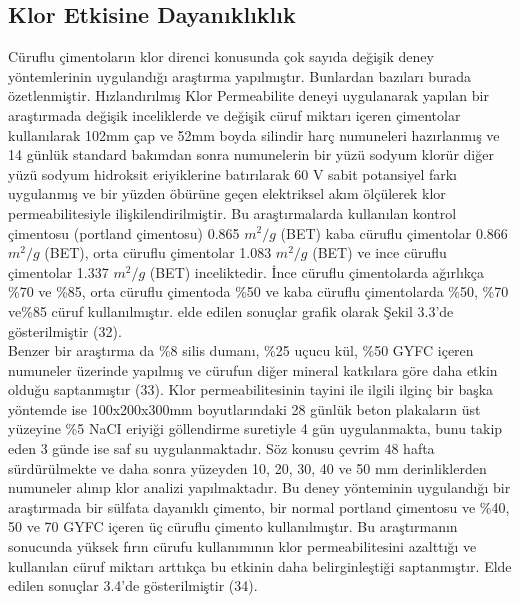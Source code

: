 \documentclass[12pt]{article}
\begin{document}
\subsection{Klor Etkisine Dayanıklıklık}
Cüruflu çimentoların klor direnci konusunda çok sayıda değişik deney
yöntemlerinin uygulandığı araştırma yapılmıştır. Bunlardan bazıları burada
özetlenmiştir.
Hızlandırılmış Klor Permeabilite deneyi uygulanarak yapılan bir araştırmada
değişik inceliklerde ve değişik cüruf miktarı içeren çimentolar kullanılarak
102mm çap ve 52mm boyda silindir harç numuneleri hazırlanmış ve
14 günlük standard bakımdan sonra numunelerin bir yüzü sodyum klorür
diğer yüzü sodyum hidroksit eriyiklerine batırılarak 60 V sabit potansiyel
farkı uygulanmış ve bir yüzden öbürüne geçen elektriksel akım ölçülerek
klor permeabilitesiyle ilişkilendirilmiştir. Bu araştırmalarda kullanılan kontrol
çimentosu (portland çimentosu) 0.865 $m^2/g$ (BET) kaba cüruflu çimentolar
0.866 $m^2/g$ (BET), orta cüruflu çimentolar 1.083 $m^2/g$ (BET) ve ince cüruflu
çimentolar 1.337 $m^2/g$ (BET) inceliktedir. İnce cüruflu çimentolarda ağırlıkça
\%70 ve \%85, orta cüruflu çimentoda \%50 ve kaba cüruflu çimentolarda
\%50, \%70 ve\%85 cüruf kullanılmıştır. elde edilen sonuçlar grafik olarak
Şekil 3.3’de gösterilmiştir (32).\\[9pt]
Benzer bir araştırma da \%8 silis dumanı, \%25 uçucu kül, \%50 GYFC içeren
numuneler üzerinde yapılmış ve cürufun diğer mineral katkılara göre daha
etkin olduğu saptanmıştır (33).
Klor permeabilitesinin tayini ile ilgili ilginç bir başka yöntemde ise
100x200x300mm boyutlarındaki 28 günlük beton plakaların üst yüzeyine
\%5 NaCI eriyiği göllendirme suretiyle 4 gün uygulanmakta, bunu takip eden
3 günde ise saf su uygulanmaktadır. Söz konusu çevrim 48 hafta sürdürülmekte
ve daha sonra yüzeyden 10, 20, 30, 40 ve 50 mm derinliklerden numuneler
alınıp klor analizi yapılmaktadır. Bu deney yönteminin uygulandığı bir
araştırmada bir sülfata dayanıklı çimento, bir normal portland çimentosu ve
\%40, 50 ve 70 GYFC içeren üç cüruflu çimento kullanılmıştır. Bu araştırmanın
sonucunda yüksek fırın cürufu kullanımının klor permeabilitesini azalttığı ve
kullanılan cüruf miktarı arttıkça bu etkinin daha belirginleştiği saptanmıştır.
Elde edilen sonuçlar 3.4’de gösterilmiştir (34).
\end{document}
